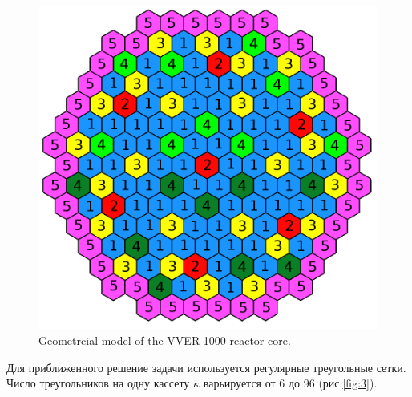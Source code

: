\documentclass[authoryear]{elsarticle}
\begin{document}
\begin{figure}[!h]
  \begin{center}
    \includegraphics[width=0.75\linewidth] {2.png}
	\caption{Geometrcial model of the VVER-1000 reactor core.}
	\label{fig:2}
  \end{center}
\end{figure} 

Для приближенного решение задачи используется регулярные треугольные сетки.
Число треугольников на одну кассету $\kappa$  варьируется от 6 до 96 (рис.\ref{fig:3}). 
\end{document}

